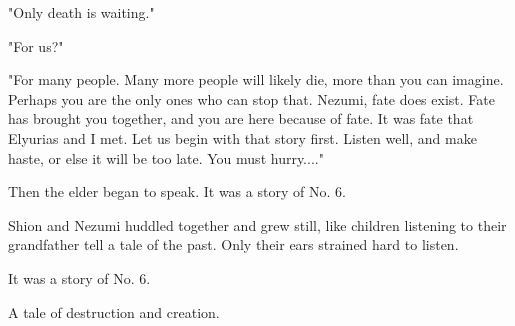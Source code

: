 "Only death is waiting."

"For us?"

"For many people. Many more people will likely die, more than you can
imagine. Perhaps you are the only ones who can stop that. Nezumi, fate
does exist. Fate has brought you together, and you are here because of
fate. It was fate that Elyurias and I met. Let us begin with that story
first. Listen well, and make haste, or else it will be too late. You
must hurry...."

Then the elder began to speak. It was a story of No. 6.

Shion and Nezumi huddled together and grew still, like children
listening to their grandfather tell a tale of the past. Only their ears
strained hard to listen.

It was a story of No. 6.

A tale of destruction and creation.